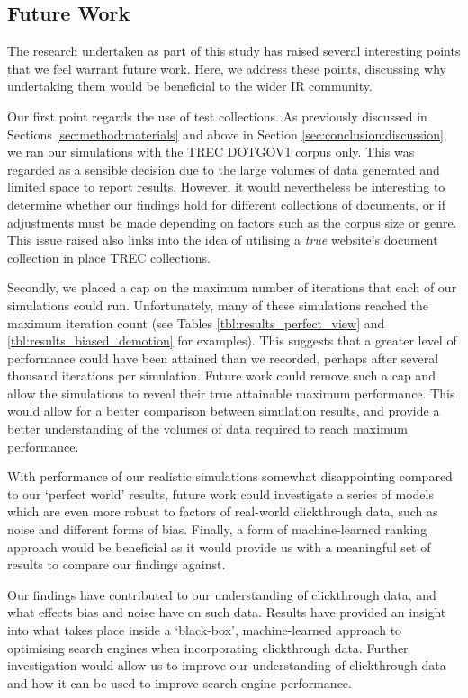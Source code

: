 \subsection{Future Work}\label{sec:conclusion:future}
The research undertaken as part of this study has raised several interesting points that we feel warrant future work. Here, we address these points, discussing why undertaking them would be beneficial to the wider IR community.

Our first point regards the use of test collections. As previously discussed in Sections \ref{sec:method:materials} and above in Section \ref{sec:conclusion:discussion}, we ran our simulations with the TREC DOTGOV1 corpus only. This was regarded as a sensible decision due to the large volumes of data generated and limited space to report results. However, it would nevertheless be interesting to determine whether our findings hold for different collections of documents, or if adjustments must be made depending on factors such as the corpus size or genre. This issue raised also links into the idea of utilising a \emph{true} website's document collection in place TREC collections.

Secondly, we placed a cap on the maximum number of iterations that each of our simulations could run. Unfortunately, many of these simulations reached the maximum iteration count (see Tables \ref{tbl:results_perfect_view} and \ref{tbl:results_biased_demotion} for examples). This suggests that a greater level of performance could have been attained than we recorded, perhaps after several thousand iterations per simulation. Future work could remove such a cap and allow the simulations to reveal their true attainable maximum performance. This would allow for a better comparison between simulation results, and provide a better understanding of the volumes of data required to reach maximum performance.

With performance of our realistic simulations somewhat disappointing compared to our `perfect world' results, future work could investigate a series of models which are even more robust to factors of real-world clickthrough data, such as noise and different forms of bias. Finally, a form of machine-learned ranking approach would be beneficial as it would provide us with a meaningful set of results to compare our findings against.

Our findings have contributed to our understanding of clickthrough data, and what effects bias and noise have on such data. Results have provided an insight into what takes place inside a `black-box', machine-learned approach to optimising search engines when incorporating clickthrough data. Further investigation would allow us to improve our understanding of clickthrough data and how it can be used to improve search engine performance.

